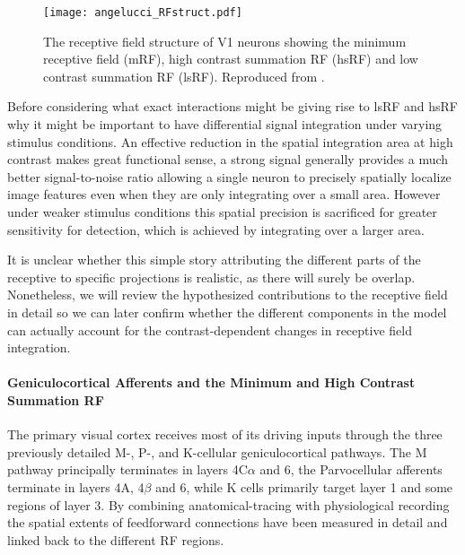 \begin{figure}
	\centering
        \texttt{[image: angelucci\_RFstruct.pdf]}
	\caption[The structure of a receptive field in V1. Reproduced from
      \cite{Angelucci2006}.]{The receptive field structure of V1
      neurons showing the minimum receptive field (mRF), high contrast
      summation RF (hsRF) and low contrast summation RF
      (lsRF). Reproduced from \cite{Angelucci2006}.}
	\label{RFstruct}
\end{figure}

Before considering what exact interactions might be giving rise to
lsRF and hsRF why it might be important to have differential signal
integration under varying stimulus conditions. An effective reduction
in the spatial integration area at high contrast makes great
functional sense, a strong signal generally provides a much better
signal-to-noise ratio allowing a single neuron to precisely spatially
localize image features even when they are only integrating over a
small area. However under weaker stimulus conditions this spatial
precision is sacrificed for greater sensitivity for detection, which
is achieved by integrating over a larger area.

It is unclear whether this simple story attributing the different
parts of the receptive to specific projections is realistic, as there
will surely be overlap. Nonetheless, we will review the hypothesized
contributions to the receptive field in detail so we can later confirm
whether the different components in the model can actually account for
the contrast-dependent changes in receptive field integration.

\paragraph{Geniculocortical Afferents and the Minimum and High Contrast Summation RF} \label{AfferentBackground}

The primary visual cortex receives most of its driving inputs through
the three previously detailed M-, P-, and K-cellular geniculocortical
pathways. The M pathway principally terminates in layers 4C$\alpha$
and 6, the Parvocellular afferents terminate in layers 4A, 4$\beta$
and 6, while K cells primarily target layer 1 and some regions of
layer 3. By combining anatomical-tracing with physiological
recording the spatial extents of feedforward connections have been
measured in detail and linked back to the different RF regions.


